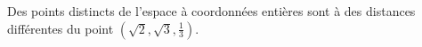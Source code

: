 Des points distincts de l'espace à coordonnées entières sont à des distances différentes du point $(\sqrt{2}, \sqrt{3}, \frac{1}{3})$.
